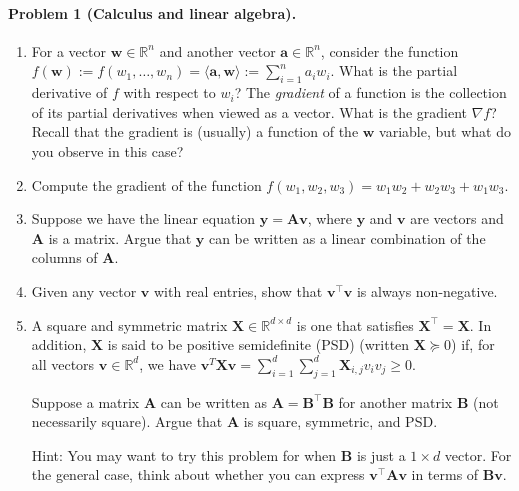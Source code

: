 \documentclass[11pt,twoside]{article}
\begin{document}
\newpage

\paragraph{Problem 1 (Calculus and linear algebra).}
\begin{enumerate}[label=(\alph*)]
\item For a vector $\mathbf w \in \mathbb{R}^n$ and another vector $\mathbf a \in \mathbb{R}^n$, consider the function $f(\mathbf w) := f(w_1, \ldots, w_n) = \langle \mathbf a, \mathbf w \rangle := \sum_{i = 1}^n a_i w_i$. What is the partial derivative of $f$ with respect to $w_i$? The \emph{gradient} of a function is the collection of its partial derivatives when viewed as a vector. What is the gradient $\nabla f$? Recall that the gradient is (usually) a function of the $\mathbf w$ variable, but what do you observe in this case?
\item Compute the gradient of the function $f(w_1, w_2, w_3) = w_1 w_2 + w_2 w_3 + w_1 w_3$.
\item Suppose we have the linear equation $\mathbf y = \mathbf A \mathbf v$, where $\mathbf y$ and $\mathbf v$ are vectors and $\mathbf A$ is a matrix. Argue that $\mathbf y$ can be written as a linear combination of the columns of $\mathbf A$.
\item Given any vector $\mathbf v$ with real entries, show that $\mathbf v^\top \mathbf v$ is always non-negative.

\item A square and symmetric matrix $\mathbf X \in \mathbb{R}^{d \times d}$ is one that satisfies $\mathbf X^\top = \mathbf X$. In addition, $\mathbf X$ is said to be positive semidefinite (PSD) (written $\mathbf X \succeq 0$) if, for all vectors $\mathbf v \in \mathbb{R}^d$, we have $\mathbf v^T \mathbf X \mathbf v = \sum_{i = 1}^d \sum_{j= 1}^d \mathbf X_{i, j} v_i v_j \geq 0$.

Suppose a matrix $\mathbf A$ can be written as $\mathbf A = \mathbf B^\top \mathbf B$ for another matrix $\mathbf B$ (not necessarily square). Argue that $\mathbf A$ is square, symmetric, and PSD.

Hint: You may want to try this problem for when $\mathbf B$ is just a $1 \times d$ vector. For the general case, think about whether you can express $\mathbf v^\top \mathbf A \mathbf v$ in terms of $\mathbf B \mathbf v$.


\end{enumerate}
\end{document}
